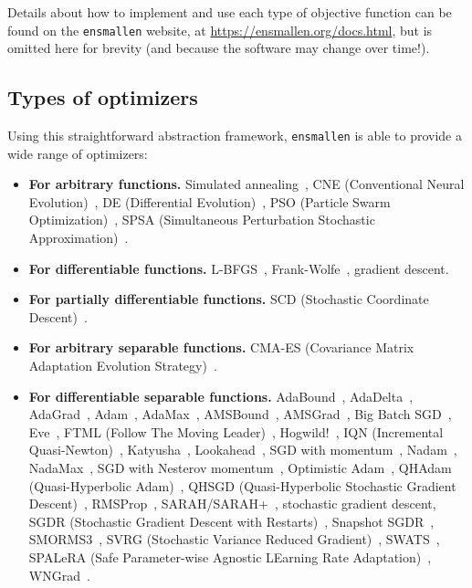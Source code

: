 Details about how to implement and use each type of objective function can be
found on the {\tt ensmallen} website, at \url{https://ensmallen.org/docs.html},
but is omitted here for brevity (and because the software may change over
time!).

\subsection{Types of optimizers}

Using this straightforward abstraction framework, {\tt ensmallen} is able to
provide a wide range of optimizers:

\begin{itemize}
  \item {\bf For arbitrary functions.}  Simulated
annealing~\cite{kirkpatrick1983optimization}, CNE
(Conventional Neural Evolution)~\cite{montana1989training}, DE (Differential
Evolution)~\cite{storn1997differential}, PSO (Particle Swarm
Optimization)~\cite{Kennedy1995}, SPSA (Simultaneous Perturbation
Stochastic Approximation)~\cite{spall1992multivariate}.

  \item {\bf For differentiable functions.}  L-BFGS~\cite{liu1989limited},
Frank-Wolfe~\cite{jaggi2013revisiting}, gradient descent.

  \item {\bf For partially differentiable functions.}  SCD (Stochastic
Coordinate Descent)~\cite{Shalev-Shwartz2009}.

  \item {\bf For arbitrary separable functions.}  CMA-ES (Covariance Matrix
Adaptation Evolution Strategy)~\cite{Hansen2001}.

  \item {\bf For differentiable separable functions.}
AdaBound~\cite{Luo2019AdaBound},
AdaDelta~\cite{zeiler2012adadelta}, AdaGrad~\cite{duchi2011adaptive},
Adam~\cite{Kingma2014}, AdaMax~\cite{Kingma2014},
AMSBound~\cite{Luo2019AdaBound}, AMSGrad~\cite{reddi2019convergence},
Big Batch SGD~\cite{De2017}, Eve~\cite{Koushik2016}, FTML (Follow The Moving
Leader)~\cite{Zheng2017},
Hogwild!~\cite{recht2011hogwild}, IQN
(Incremental Quasi-Newton)~\cite{1106.5730}, Katyusha~\cite{Allen-Zhu2016},
Lookahead~\cite{Zhang2019}, SGD with momentum~\cite{rumelhart1988learning},
Nadam~\cite{Dozat2015},
NadaMax~\cite{Dozat2015}, SGD with Nesterov momentum~\cite{Nesterov1983},
Optimistic
Adam~\cite{daskalakis2017training}, QHAdam (Quasi-Hyperbolic
Adam)~\cite{ma2019qh}, QHSGD
(Quasi-Hyperbolic Stochastic Gradient Descent)~\cite{ma2019qh},
RMSProp~\cite{tieleman2012lecture},
SARAH/SARAH+~\cite{Nguyen2017}, stochastic gradient descent, SGDR (Stochastic Gradient
Descent with Restarts)~\cite{Loshchilov2016}, Snapshot SGDR~\cite{Huang2017},
SMORMS3~\cite{Funk2015}, SVRG (Stochastic Variance Reduced
Gradient)~\cite{Johnson2013}, SWATS~\cite{Keskar2017},
SPALeRA (Safe Parameter-wise Agnostic LEarning Rate
Adaptation)~\cite{Schoenauer2017},
WNGrad~\cite{Wu2018}.


\end{itemize}
